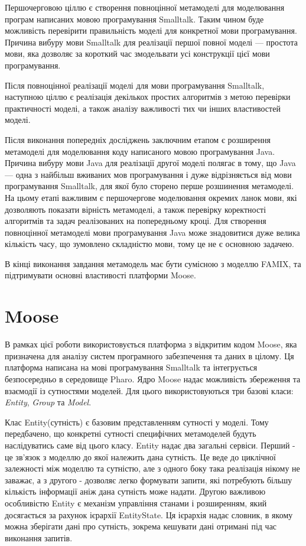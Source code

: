 \documentclass[12pt,a4paper]{article}
\begin{document}
Першочерговою ціллю є створення повноцінної метамоделі для моделювання програм написаних мовою програмування Smalltalk. Таким чином буде можливість перевірити правильність моделі для конкретної мови програмування. Причина вибуру мови Smalltalk для реалізації першої повної моделі --- простота мови, яка дозволяє за короткий час змодельвати усі конструкції цієї мови програмування.

Після повноцінної реалізації моделі для мови програмування Smalltalk, наступною ціллю є реалізація декількох простих алгоритмів з метою перевірки практичності моделі, а також аналізу важливості тих чи інших властивостей моделі.

Після виконання попередніх досліджень заключним етапом є розширення метамоделі для моделювання коду написаного мовою програмування Java. Причина вибуру мови Java для реалізації другої моделі полягає в тому, що Java --- одна з найбільш вживаних мов програмування і дуже відрізняється від мови програмування Smalltalk, для якої було сторено перше розшинення метамоделі. На цьому етапі важливим є першочергове моделювання окремих ланок мови, які дозволяють показати вірність метамоделі, а також перевірку коректності алгоритмів та задач реалізованих на попередньому кроці. Для створення повноцінної метамоделі мови програмування Java може знадовитися дуже велика кількість часу, що зумовлено складністю мови, тому це не є основною задачею.

В кінці виконання завдання метамодель має бути сумісною з моделлю FAMIX, та підтримувати основні властивості платформи Moose. 

\clearpage

\section{Moose}

В рамках цієї роботи використовується платформа з відкритим кодом Moose\cite{moose}, яка призначена для аналізу систем програмного забезпечення та даних в цілому. Ця платформа написана на мові програмування Smalltalk та інтегрується безпосередньо в середовище Pharo. Ядро Moose надає можливість збереження та взаємодії із сутностями моделей. Для цього використовуються три базові класи: \emph{Entity}, \emph{Group} та \emph{Model}.

Клас Entity(сутність) є базовим представленням сутності у моделі. Тому передбачено, що конкретні сутності специфічних метамоделей будуть наслідуватись саме від цього класу. Entity надає два загальні сервіси. Перший - це зв'язок з моделлю до якої належить дана сутність. Це веде до циклічної залежності між моделлю та сутністю, але з одного боку така реалізація нікому не заважає, а з другого - дозволяє легко формувати запити, які потребують більшу кількість інформації аніж дана сутність може надати. Другою важливою особливістю Entity є механізм управління станами і розширенням, який досягається за рахунок ієрархії EntityState. Ця ієрархія надає словник, в якому можна зберігати дані про сутність, зокрема кешувати дані отримані під час виконання запитів.
\end{document}
